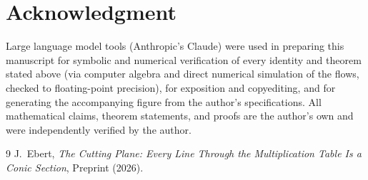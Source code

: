 \documentclass[11pt]{amsart}
\theoremstyle{remark}
\begin{document}
\section*{Acknowledgment}

Large language model tools (Anthropic's Claude) were used in preparing this manuscript for symbolic and numerical verification of every identity and theorem stated above (via computer algebra and direct numerical simulation of the flows, checked to floating-point precision), for exposition and copyediting, and for generating the accompanying figure from the author's specifications. All mathematical claims, theorem statements, and proofs are the author's own and were independently verified by the author.

\begin{thebibliography}{9}
 J.~Ebert, \emph{The Cutting Plane: Every Line Through the Multiplication Table Is a Conic Section}, Preprint (2026).
\end{thebibliography}
\end{document}
